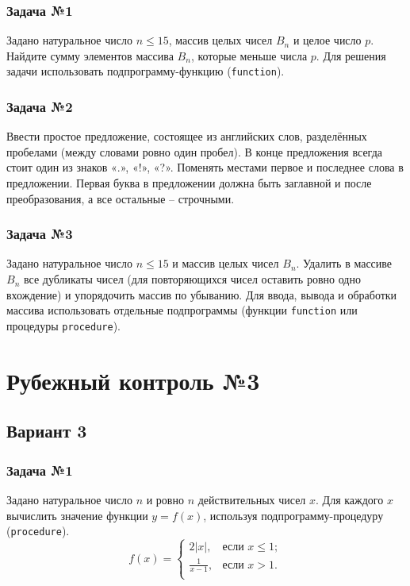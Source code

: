 \documentclass[12pt,a5paper,landscape]{report}
\begin{document}
\subsubsection*{Задача №1}
Задано натуральное число $n \le 15$, массив целых чисел $B_n$ и целое число $p$. Найдите сумму элементов массива $B_n$, которые меньше числа $p$. Для решения задачи использовать подпрограмму-функцию (\texttt{function}).
\subsubsection*{Задача №2}
Ввести простое предложение, состоящее из английских слов, разделённых пробелами (между словами ровно один пробел). В конце предложения всегда стоит один из знаков «.», «!», «?». Поменять местами первое и последнее слова в предложении. Первая буква в предложении должна быть заглавной и после преобразования, а все остальные -- строчными.
\subsubsection*{Задача №3}
Задано натуральное число $n \le 15$ и массив целых чисел $B_n$. Удалить в массиве $B_n$ все дубликаты чисел (для повторяющихся чисел оставить ровно одно вхождение) и упорядочить массив по убыванию. Для ввода, вывода и обработки массива использовать отдельные подпрограммы (функции \texttt{function} или процедуры \texttt{procedure}).


\section*{Рубежный контроль №3}
\subsection*{Вариант 3}
\subsubsection*{Задача №1}
Задано натуральное число $n$ и ровно $n$ действительных чисел $x$. Для каждого $x$ вычислить значение функции $y=f(x)$, используя подпрограмму-процедуру (\texttt{procedure}).
\begin{equation*}
f(x) = 
\begin{cases}
  2|x|, &\text{если $x \le 1$};\\
  \frac{1}{x-1}, &\text{если $x > 1$}.\\
\end{cases}
\end{equation*}
\end{document}
